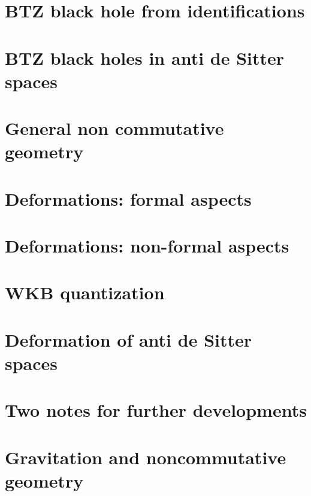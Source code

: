 \documentclass[a4paper,twoside,11pt]{book}
\begin{document}
\chapter{BTZ black hole from identifications}




\chapter{BTZ black holes in anti de Sitter spaces}                  \label{ChapBHinAdS}









\chapter{General non commutative geometry}




\chapter{Deformations: formal aspects}          \label{ChapDefo}


\chapter{Deformations: non-formal aspects}




\chapter{WKB quantization}


\chapter{Deformation of anti de Sitter spaces}   \label{ChDefoBH}


\chapter{Two notes for further developments}        \label{ChapNoteDev}



\chapter{Gravitation and noncommutative geometry}

\end{document}
